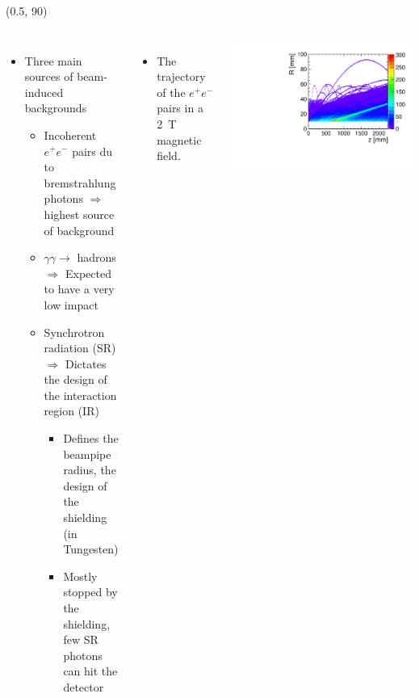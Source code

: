 \documentclass[final,xcolor={dvipsnames,svgnames,x11names,table}]{beamer}
\begin{document}
\begin{frame}
\begin{textblock}{39.5}
\begin{tcolorbox}[title=The simulation of the drift chamber with FCCSW]
  \end{tcolorbox}
\end{textblock}



\begin{textblock}{80}(0.5, 90)
  \begin{tcolorbox}[title=Main sources of beam-induced backgrounds at the FCC-ee and the impact on the IDEA drift chamber]

  \begin{columns}
    \begin{itemize}
      \item Three main sources of beam-induced backgrounds
      \begin{itemize}
        \item Incoherent $e^+e^-$ pairs du to bremstrahlung photons $\Rightarrow$ highest source of background
        \item $\gamma\gamma\rightarrow$ hadrons $\Rightarrow$ Expected to have a very low impact
        \item Synchrotron radiation (SR) $\Rightarrow$ Dictates the design of the interaction region (IR)
          \begin{itemize}
            \item Defines the beampipe radius, the design of the shielding (in Tungesten)
            \item Mostly stopped by the shielding, few SR photons can hit the detector
          \end{itemize}
      \end{itemize}
    \end{itemize}

    \begin{itemize}
      \item The trajectory of the $e^+e^−$ pairs in a 2~T magnetic field.
    \end{itemize}
    \centering
    \includegraphics[width=\textwidth]{../figures/pairs_R_Z}


\end{columns}
\end{tcolorbox}
\end{textblock}
\end{frame}
\end{document}
